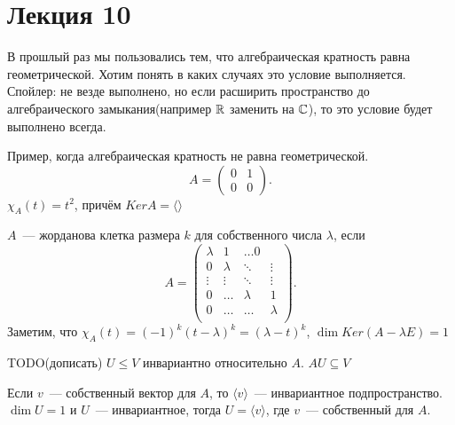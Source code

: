 \section*{Лекция 10}
\begin{motivation}
    В прошлый раз мы пользовались тем, что алгебраическая кратность равна геометрической. Хотим понять в каких случаях это условие
    выполняется. Спойлер: не везде выполнено, но если расширить пространство до алгебраического замыкания(например $\mathbb{R}$ заменить на $\mathbb{C}$),
    то это условие будет выполнено всегда.
\end{motivation}
\begin{example}
    Пример, когда алгебраическая кратность не равна геометрической.
     \[
         A = 
         \begin{pmatrix}
             0 & 1\\
             0 & 0
         \end{pmatrix}
    .\] 
    $\chi_A(t) = t^2$, причём $Ker A = \langle\rangle$
\end{example}
\begin{definition}
    $A$~--- жорданова клетка размера $k$ для собственного числа $\lambda$, если
     \[
         A = 
         \begin{pmatrix}
             \lambda & 1 & \dots 0\\
             0 & \lambda & \ddots & \vdots\\
             \vdots&\vdots&\ddots&\vdots\\
             0 & \dots & \lambda & 1\\
             0 & \dots & \dots & \lambda\\
         \end{pmatrix}
    .\] 
    Заметим, что $\chi_A(t) = (-1)^k(t-\lambda)^k= (\lambda-t)^k$,  $\dim Ker(A - \lambda E) = 1$
\end{definition}
\begin{definition}
    TODO(дописать)
    $U\le V$ инвариантно относительно $A$. $AU \subseteq V$
\end{definition}
\begin{remark}
    Если $v$~--- собственный вектор для $A$, то $\langle v \rangle$~--- инвариантное подпространство.
    $\dim U = 1$ и $U$~--- инвариантное, тогда $U = \langle v\rangle$, где  $v$~--- собственный для $A$.
\end{remark}
